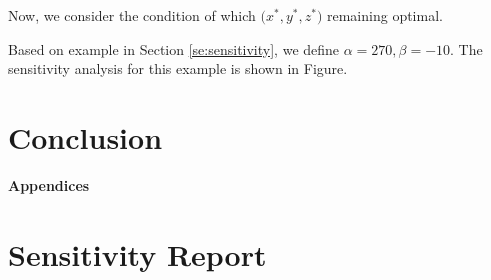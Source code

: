 \documentclass[a4paper,11pt]{article}
\begin{document}
Now, we consider the condition of which $\big( x^*,y^*,z^* \big)$ remaining optimal.


Based on example in Section \ref{se:sensitivity}, we define $\alpha = 270, \beta = -10$. The sensitivity analysis for this example is shown in Figure.


\section{Conclusion}

\printbibliography
\newpage
\begin{center}
{\bf\Large Appendices}
\end{center}

\appendix
\section{Sensitivity Report}
\label{se:report}
\end{document}
